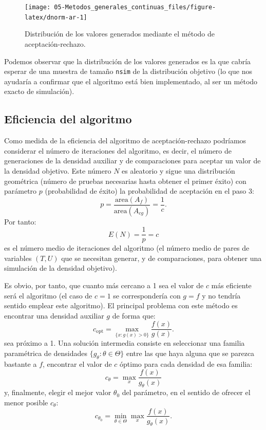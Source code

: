 \documentclass[
]{book}
\theoremstyle{break}
\theoremstyle{definition}
\theoremstyle{definition}
\theoremstyle{definition}
\theoremstyle{remark}
\begin{document}
\begin{enumerate}
  \begin{figure}[!htb]

  {\centering \texttt{[image: 05-Metodos\_generales\_continuas\_files/figure-latex/dnorm-ar-1]} 

  }

  \caption{Distribución de los valores generados mediante el método de aceptación-rechazo.}\label{fig:dnorm-ar}
  \end{figure}

  Podemos observar que la distribución de los valores generados es la que cabría esperar de una muestra de tamaño \texttt{nsim} de la distribución objetivo (lo que nos ayudaría a confirmar que el algoritmo está bien implementado, al ser un método exacto de simulación).
\end{enumerate}

\hypertarget{eficiencia-del-algoritmo}{%
\subsection{Eficiencia del algoritmo}\label{eficiencia-del-algoritmo}}

Como medida de la eficiencia del algoritmo de aceptación-rechazo
podríamos considerar el número de iteraciones del algoritmo,
es decir, el número de generaciones de la densidad auxiliar y
de comparaciones para aceptar un valor de la densidad objetivo.
Este número \(N\) es aleatorio y sigue una distribución geométrica
(número de pruebas necesarias hasta obtener el primer éxito)
con parámetro \(p\) (probabilidad de éxito) la probabilidad de aceptación
en el paso 3:
\[p = \frac{\text{area}\left(
        A_{f}\right) }{\text{area}\left( A_{cg}\right) }=\frac{1}{c}.\]
Por tanto:
\[E\left( N \right) = \frac1p = c\]
es el número medio de iteraciones del algoritmo
(el número medio de pares de variables \(\left( T,U\right)\)
que se necesitan generar, y de comparaciones, para obtener
una simulación de la densidad objetivo).

Es obvio, por tanto, que cuanto más cercano a 1 sea el valor de \(c\) más eficiente será el algoritmo (el caso de \(c=1\) se correspondería con \(g=f\) y no tendría sentido emplear este algoritmo).
El principal problema con este método es encontrar una densidad auxiliar \(g\) de forma que:
\[c_{\text{opt}}=\max_{\{x : g(x) >0\}}
\frac{f(x) }{g(x) }.\]
sea próximo a 1.
Una solución intermedia consiste en seleccionar una familia paramétrica de densidades \(\{g_{\theta} : \theta \in \Theta\}\) entre las que haya alguna que se parezca bastante a \(f\),
encontrar el valor de \(c\) óptimo para cada densidad de esa familia:
\[c_{\theta}=\max_{x}\frac{f\left(  x\right)  }{g_{\theta}(x) }\]
y, finalmente, elegir el mejor valor \(\theta_{0}\) del parámetro, en el sentido de ofrecer el menor posible \(c_{\theta}\):
\[c_{\theta_{0}}=\min_{\theta\in\Theta}\max_{x}\frac{f\left(  x\right) }{g_{\theta}\left(  x\right)  }.\]
\end{document}
